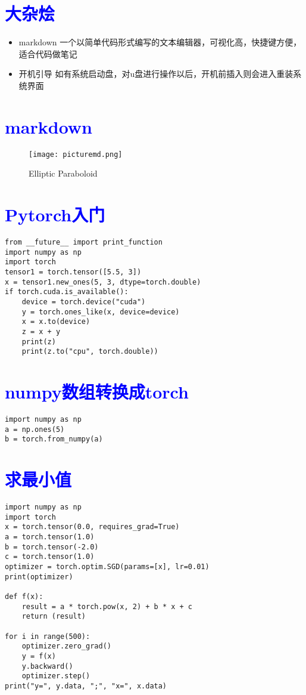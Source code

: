 \documentclass{article}
\begin{document}
\section{\textcolor{blue}{大杂烩}}
\begin{itemize}
    \item markdown 一个以简单代码形式编写的文本编辑器，可视化高，快捷键方便，适合代码做笔记
    \item 开机引导 如有系统启动盘，对u盘进行操作以后，开机前插入则会进入重装系统界面
\end{itemize}
\section{\textcolor{blue}{markdown}}
\begin{figure}[htbp]
    \centering
    \texttt{[image: picturemd.png]}
    \caption{Elliptic Paraboloid}
    \end{figure} 
\section{\textcolor{blue}{Pytorch入门}}
\begin{lstlisting}
from __future__ import print_function
import numpy as np
import torch    
tensor1 = torch.tensor([5.5, 3])
x = tensor1.new_ones(5, 3, dtype=torch.double) 
if torch.cuda.is_available():
    device = torch.device("cuda")        
    y = torch.ones_like(x, device=device) 
    x = x.to(device)                  
    z = x + y
    print(z)
    print(z.to("cpu", torch.double))    
\end{lstlisting}
\section{\textcolor{blue}{numpy数组转换成torch}}
\begin{lstlisting}
import numpy as np
a = np.ones(5)
b = torch.from_numpy(a)
\end{lstlisting}
\section{\textcolor{blue}{求最小值}}
\begin{lstlisting}
import numpy as np
import torch
x = torch.tensor(0.0, requires_grad=True)  
a = torch.tensor(1.0)
b = torch.tensor(-2.0)
c = torch.tensor(1.0)
optimizer = torch.optim.SGD(params=[x], lr=0.01)  
print(optimizer)
 
def f(x):
    result = a * torch.pow(x, 2) + b * x + c
    return (result)
 
for i in range(500):
    optimizer.zero_grad() 
    y = f(x)
    y.backward()  
    optimizer.step() 
print("y=", y.data, ";", "x=", x.data)
\end{lstlisting}
\end{document}
